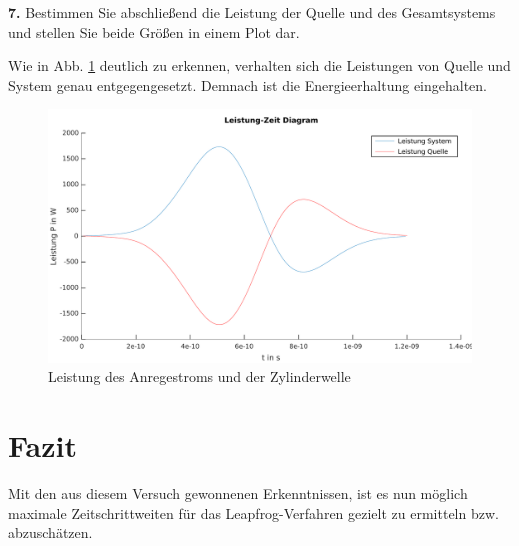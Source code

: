 \documentclass[Protokollheft.tex]{subfiles}
\begin{document}
\begin{framed}
	\noindent \textbf{7.} Bestimmen Sie abschließend die Leistung der Quelle und des Gesamtsystems und stellen Sie beide Größen in einem Plot dar.\label{exer:powerPlot}
\end{framed}
\noindent
 Wie in Abb. \ref{fig:leistung} deutlich zu erkennen, verhalten sich die Leistungen von Quelle und System genau entgegengesetzt. Demnach ist die Energieerhaltung eingehalten.
\begin{figure}[h]
	\centering
	\includegraphics[width=0.7\linewidth]{Leistung}
	\caption{Leistung des Anregestroms und der Zylinderwelle}
	\label{fig:leistung}
\end{figure}





\section{Fazit}
Mit den aus diesem Versuch gewonnenen Erkenntnissen, ist es nun möglich maximale Zeitschrittweiten für das Leapfrog-Verfahren gezielt zu ermitteln bzw. abzuschätzen.
\end{document}
